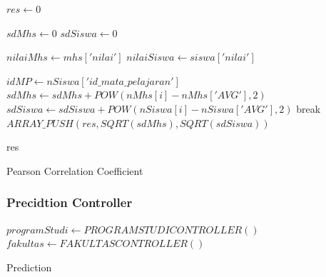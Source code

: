\begin{algorithm}[H]
  \begin{algorithmic}[1]
        \State $res \gets 0$
        
        \State $sdMhs \gets 0$
        \State $sdSiswa \gets 0$
        
        \State $nilaiMhs \gets mhs['nilai']$
        \State $nilaiSiswa \gets siswa['nilai']$
        
            \State $idMP \gets nSiswa['id\_mata\_pelajaran']$
                        \State $sdMhs \gets sdMhs + POW(nMhs[i]-nMhs['AVG'],2)$
                        \State $sdSiswa \gets sdSiswa + POW(nSiswa[i]-nSiswa['AVG'],2)$
                    \EndFor
                    \State break
                \EndIf
            \EndFor
        \EndFor
        \State $ARRAY\_PUSH(res, SQRT(sdMhs), SQRT(sdSiswa))$
        
        \State \Return res
    \EndProcedure
  \end{algorithmic} 
  \caption{Pearson Correlation Coefficient}
  \label{alg:calculateStandarDeviation pearson}
\end{algorithm}


\subsubsection{Precidtion Controller}
\label{subsec:prediction}

\begin{algorithm}[H]
  \begin{algorithmic}[1]
        \State $programStudi \gets PROGRAMSTUDICONTROLLER()$
        \State $fakultas \gets FAKULTASCONTROLLER()$
    \EndProcedure
  \end{algorithmic} 
  \caption{Prediction}
  \label{alg:contructor prediction}
\end{algorithm}

